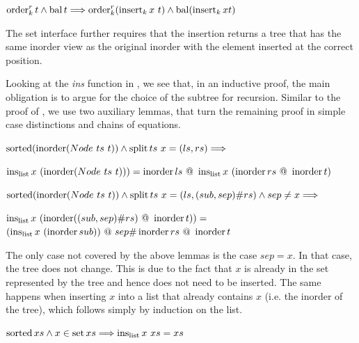 \begin{theorem}
    \label{thm:ins-invar}
    $\operatorname{order}^r_k t \wedge \operatorname{bal} t \Longrightarrow
    \operatorname{order}^r_k (\operatorname{insert}_k x\ t) \wedge \operatorname{bal} (\operatorname{insert}_k x t)$
\end{theorem}


The set interface further requires that the insertion returns a tree
that has the same inorder view as the original inorder with the element
inserted at the correct position.

Looking at the \textit{ins} function in ,
we see that, in an inductive proof, the main obligation
is to argue for the choice of the subtree for recursion.
Similar to the proof of ,
we use two auxiliary lemmas, that turn the remaining
proof in simple case distinctions and chains of equations.

\begin{lemma}
    \label{lem:sorted-left-x-in}
    $\operatorname{sorted}(\operatorname{inorder} (Node\ ts\ t)) \wedge \operatorname{split} ts\ x = (ls, rs) \Longrightarrow$ \\
    \begin{center}
    $\operatorname{ins_{list}} x\ (\operatorname{inorder} (Node\ ts\ t))) = \operatorname{inorder} ls\ @\ \operatorname{ins_{list}} x\ (\operatorname{inorder} rs\ @\ \operatorname{inorder} t)$
    \end{center}
\end{lemma}

\begin{lemma}
    \label{lem:sorted-right-x-in}
    $\operatorname{sorted} (\operatorname{inorder} (Node\ ts\ t)) \wedge \operatorname{split} ts\ x = (ls, (sub,sep)\#rs) \wedge sep \neq x \Longrightarrow$ \\
    \begin{center}
    $\inslist x\ (\inorder ((sub,sep)\#rs)\ @\ \inorder t)) =$\\
    $ (\operatorname{ins_{list}} x\ (\operatorname{inorder} sub))\ @\ sep \# \operatorname{inorder} rs\ @\ \operatorname{inorder} t$
    \end{center}
\end{lemma}

The only case not covered by the above lemmas is the case $sep = x$.
In that case, the tree does not change.
This is due to the fact that $x$ is already in the set represented by the tree
and hence does not need to be inserted.
The same happens when inserting $x$ into a list that already contains $x$
(i.e. the inorder of the tree),
which follows simply by induction on the list.

\begin{lemma}
    \label{lem:sorted-x-in}
    $\operatorname{sorted} xs \wedge x \in \operatorname{set} xs \Longrightarrow \operatorname{ins_{list}} x\ xs = xs$
\end{lemma}

